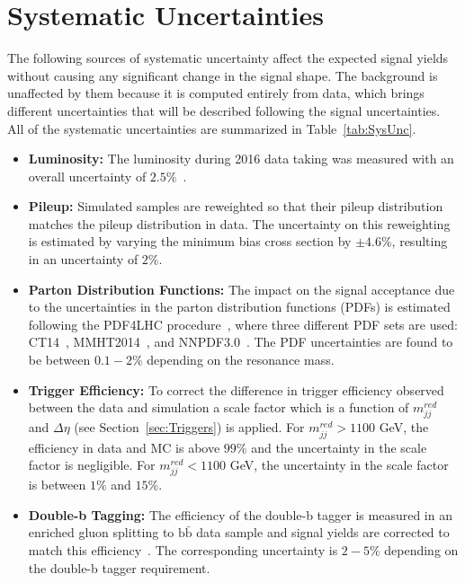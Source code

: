\section{Systematic Uncertainties}
\label{sec:SysUnc}

The following sources of systematic uncertainty affect the expected signal yields without causing any significant change in the signal shape. The background is unaffected by them because it is computed entirely from data, which brings different uncertainties that will be described following the signal uncertainties. All of the systematic uncertainties are summarized in Table~\ref{tab:SysUnc}.

\begin{itemize}
\item \textbf{Luminosity:} The luminosity during 2016 data taking was measured with an overall uncertainty of $2.5\%$~\cite{Lumi}.

\item \textbf{Pileup:} Simulated samples are reweighted so that their pileup distribution matches the pileup distribution in data. The uncertainty on this reweighting is estimated by varying the minimum bias cross section by $\pm4.6\%$, resulting in an uncertainty of $2\%$.

\item \textbf{Parton Distribution Functions:} The impact on the signal acceptance due to the uncertainties in the parton distribution functions (PDFs) is estimated following the PDF4LHC procedure~\cite{PDFUncertinty}, where three different PDF sets are used: CT14~\cite{CT14}, MMHT2014~\cite{MMHT}, and NNPDF3.0~\cite{NNPDF}. The PDF uncertainties are found to be between $0.1-2\%$ depending on the resonance mass.

\item \textbf{Trigger Efficiency:} To correct the difference in trigger efficiency observed between the data and simulation a scale factor which is a function of $m_{jj}^{red}$ and $\Delta\eta$ (see Section~\ref{sec:Triggers}) is applied. For $m_{jj}^{red} > 1100$ GeV, the efficiency in data and MC is above $99\%$ and the uncertainty in the scale factor is negligible. For $m_{jj}^{red} < 1100$ GeV, the uncertainty in the scale factor is between $1\%$ and $15\%$. 

\item \textbf{Double-b Tagging:} The efficiency of the double-b tagger is measured in an enriched gluon splitting to $\mathrm{b\bar{b}}$ data sample and signal yields are corrected to match this efficiency~\cite{DoubleB}. The corresponding uncertainty is $2-5\%$ depending on the double-b tagger requirement.


\end{itemize}
